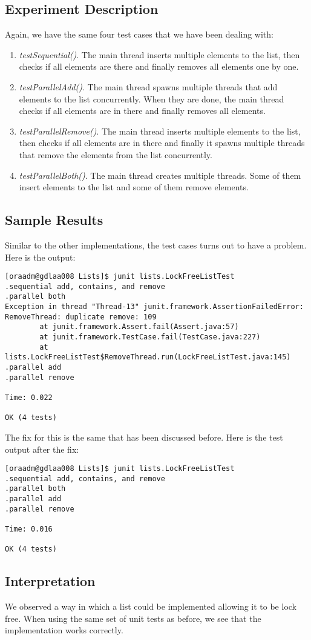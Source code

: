 \subsection{Experiment Description}
\par
Again, we have the same four test cases that we have been dealing with:
\par
\begin{enumerate}
\item \textit{testSequential()}. The main thread inserts multiple elements to
the list, then checks if all elements are there and finally removes all elements
one by one.
\item \textit{testParallelAdd()}. The main thread spawns multiple threads that
add elements to the list concurrently. When they are done, the main thread
checks if all elements are in there and finally removes all elements.
\item \textit{testParallelRemove()}. The main thread inserts multiple elements
to the list, then checks if all elements are in there and finally it spawns
multiple threads that remove the elements from the list concurrently.
\item \textit{testParallelBoth()}. The main thread creates multiple threads.
Some of them insert elements to the list and some of them remove elements.
\end{enumerate}
\par
\subsection{Sample Results}
\par
Similar to the other implementations, the test cases turns out to have a
problem. Here is the output:
\par
\begin{verbatim}
[oraadm@gdlaa008 Lists]$ junit lists.LockFreeListTest
.sequential add, contains, and remove
.parallel both
Exception in thread "Thread-13" junit.framework.AssertionFailedError:
RemoveThread: duplicate remove: 109
        at junit.framework.Assert.fail(Assert.java:57)
        at junit.framework.TestCase.fail(TestCase.java:227)
        at lists.LockFreeListTest$RemoveThread.run(LockFreeListTest.java:145)
.parallel add
.parallel remove

Time: 0.022

OK (4 tests)
\end{verbatim}
\par
The fix for this is the same that has been discussed before. Here is the test
output after the fix:
\begin{verbatim}
[oraadm@gdlaa008 Lists]$ junit lists.LockFreeListTest
.sequential add, contains, and remove
.parallel both
.parallel add
.parallel remove

Time: 0.016

OK (4 tests)
\end{verbatim}
\par
\subsection{Interpretation}
We observed a way in which a list could be implemented allowing it to be lock
free. When using the same set of unit tests as before, we see that the
implementation works correctly.
